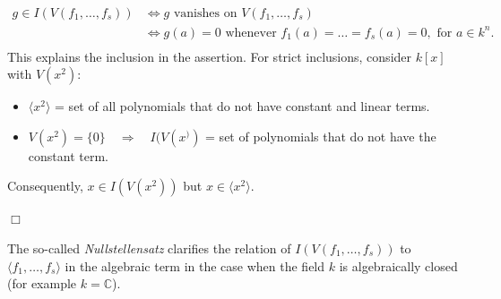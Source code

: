 \begin{lemma}[title = Lemma 1.4.10 continued]
    \begin{align*}
        g \in I(V(f_1, \ldots, f_s)) & \Leftrightarrow g \text{ vanishes on } V(f_1, \ldots, f_s) \\ 
                                     & \Leftrightarrow g(a) = 0 \text{ whenever } f_1(a)  = \ldots = f_s(a) = 0, \text{ for } a \in k^n. \\
    \end{align*}
    This explains the inclusion in the assertion. For strict inclusions, consider $k[x]$ with $V(x^2)$: 
    \begin{itemize}
      \item $\langle x^2 \rangle$ = set of all polynomials that do not have constant and linear terms. 
      \item $V(x^2) = \{0\} \quad \Rightarrow \quad I(V(x^))$ = set of polynomials that do not have the constant term.   
    \end{itemize}
    Consequently, $x \in I(V(x^2))$ but $x \in \langle x^2 \rangle$. 

    \begin{flushright}
      $\Box $
    \end{flushright}
\end{lemma} 

The so-called \textit{Nullstellensatz} clarifies the relation of $I(V(f_1, \ldots, f_s))$ to $\langle f_1, \ldots, f_s \rangle$ in the algebraic term in the 
case when the field $k$ is algebraically closed (for example $k = \mathbb{C}$).

